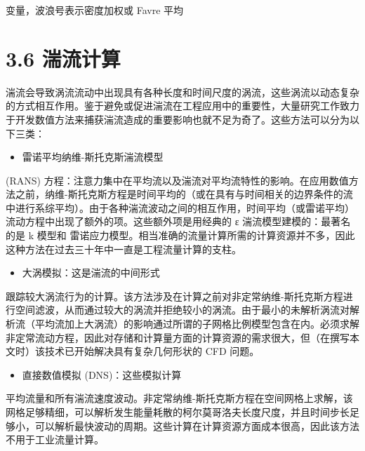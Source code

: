 \documentclass[11pt,a4paper,openany,fontset=none]{ctexbook}
\begin{document}
变量，波浪号表示密度加权或 Favre 平均

\section*{3.6 湍流计算}

湍流会导致涡流流动中出现具有各种长度和时间尺度的涡流，这些涡流以动态复杂的方式相互作用。鉴于避免或促进湍流在工程应用中的重要性，大量研究工作致力于开发数值方法来捕获湍流造成的重要影响也就不足为奇了。这些方法可以分为以下三类：

\begin{itemize}

\item 雷诺平均纳维-斯托克斯湍流模型

\end{itemize}

(RANS) 方程：注意力集中在平均流以及湍流对平均流特性的影响。在应用数值方法之前，纳维-斯托克斯方程是时间平均的（或在具有与时间相关的边界条件的流中进行系综平均）。由于各种湍流波动之间的相互作用，时间平均（或雷诺平均）流动方程中出现了额外的项。这些额外项是用经典的 ε 湍流模型建模的：最著名的是 k 模型和
雷诺应力模型。相当准确的流量计算所需的计算资源并不多，因此这种方法在过去三十年中一直是工程流量计算的支柱。

\begin{itemize}

\item 大涡模拟：这是湍流的中间形式

\end{itemize}

跟踪较大涡流行为的计算。该方法涉及在计算之前对非定常纳维-斯托克斯方程进行空间滤波，从而通过较大的涡流并拒绝较小的涡流。由于最小的未解析涡流对解析流（平均流加上大涡流）的影响通过所谓的子网格比例模型包含在内。必须求解非定常流动方程，因此对存储和计算量方面的计算资源的需求很大，但（在撰写本文时）该技术已开始解决具有复杂几何形状的 CFD 问题。

\begin{itemize}

\item 直接数值模拟 (DNS)：这些模拟计算

\end{itemize}

平均流量和所有湍流速度波动。非定常纳维-斯托克斯方程在空间网格上求解，该网格足够精细，可以解析发生能量耗散的柯尔莫哥洛夫长度尺度，并且时间步长足够小，可以解析最快波动的周期。这些计算在计算资源方面成本很高，因此该方法不用于工业流量计算。
\end{document}
